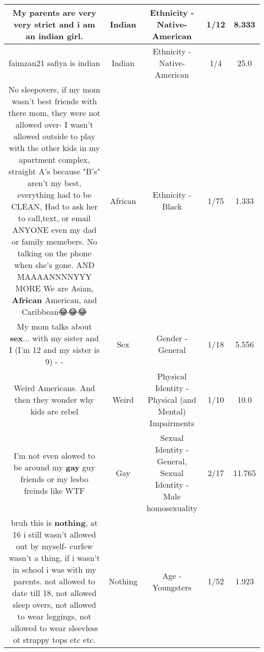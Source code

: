 \documentclass[11pt]{article}
\newlength\mylength
\begin{document}
\begin{center}
\begin{longtable}{|C{.65\mylength}|C{.30\mylength}|C{.12\mylength}|C{.12\mylength}|C{.12\mylength}|}
  \small My parents are very very strict and i am an \textbf{indian} girl.\normalsize   & Indian & Ethnicity - Native-American & 1/12 & 8.333 \\  \hline
  \small faimzan21 safiya is indian\normalsize   & Indian & Ethnicity - Native-American & 1/4 & 25.0 \\  \hline
  \small No sleepovers, if my mom wasn't best friends with there mom, they were not allowed over- I wasn't allowed outside to play with the other kids in my apartment complex, straight A's because "B's" aren't my best, everything had to be CLEAN, Had to ask her to call,text, or email ANYONE even my dad or family memebers. No talking on the phone when she's gone. AND MAAAANNNNYYY MORE We are Asian, \textbf{African} American, and Caribbean😂😂😂\normalsize   & African & Ethnicity - Black & 1/75 & 1.333 \\  \hline
  \small My mom talks about \textbf{sex}... with my sister and I (I'm 12 and my sister is 9) - -\normalsize   & Sex & Gender - General & 1/18 & 5.556 \\  \hline
  \small Weird Americans. And then they wonder why kids are rebel\normalsize   & Weird & Physical Identity - Physical (and Mental) Impairments & 1/10 & 10.0 \\  \hline
  \small I'm not even alowed to be around my \textbf{g\textbf{ay}} guy friends or my lesbo freinds like WTF\normalsize   & Gay & Sexual Identity - General, Sexual Identity - Male homosexuality & 2/17 & 11.765 \\  \hline
  \small bruh this is \textbf{nothing}, at 16 i still wasn't allowed out by myself- curfew wasn't a thing, if i wasn't in school i was with my parents. not allowed to date till 18, not allowed sleep overs, not allowed to wear leggings, not allowed to wear sleevless ot strappy tops etc etc.\normalsize   & Nothing & Age - Youngsters & 1/52 & 1.923 \\  \hline

\end{longtable}
\end{center}
\end{document}
